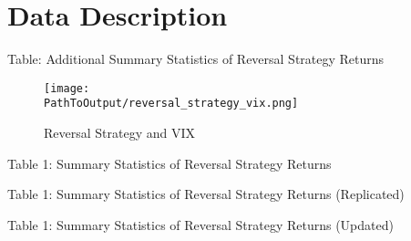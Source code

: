 \documentclass{article}
\newcommand*{\PathToOutput}{../output/}
\begin{document}
\section{Data Description}

\begin{landscape}
\begin{table}
    \centering
    \caption*{Table: Additional Summary Statistics of Reversal Strategy Returns}

    
\end{table}

\begin{figure}
    \centering
    \texttt{[image: \\PathToOutput/reversal\_strategy\_vix.png]}
    \caption{Reversal Strategy and VIX}
\end{figure}

\end{landscape}

\begin{table}
    \centering
    \caption*{Table 1:  Summary Statistics of Reversal Strategy Returns}

    
\end{table}


\begin{table}
    \centering
    \caption*{Table 1:  Summary Statistics of Reversal Strategy Returns (Replicated)}

    
\end{table}


\begin{table}
    \centering
    \caption*{Table 1:  Summary Statistics of Reversal Strategy Returns (Updated)}

    
\end{table}
\end{document}
